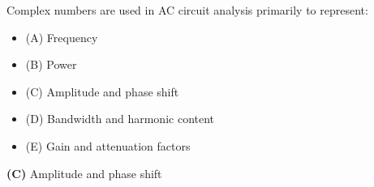 

Complex numbers are used in AC circuit analysis primarily to represent:

\begin{itemize}
\item{(A)} Frequency
\vskip 5pt 
\item{(B)} Power
\vskip 5pt 
\item{(C)} Amplitude and phase shift
\vskip 5pt 
\item{(D)} Bandwidth and harmonic content
\vskip 5pt 
\item{(E)} Gain and attenuation factors
\end{itemize}







{\bf (C)} Amplitude and phase shift
 










